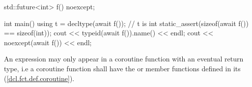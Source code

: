 \enterexample
\begin{codeblock}	
std::future<int> f() noexcept;
	
int main() {
  using t = decltype(await f()); // t is int
  static_assert(sizeof(await f()) == sizeof(int));
  cout << typeid(await f()).name() << endl;
  cout << noexcept(await f()) << endl;
}
\end{codeblock}
\exitexample%

\pnum
An  expression may only appear in a coroutine function 
with an eventual return type, i.e a coroutine function shall have the  or  member
functions defined in its  (\ref{dcl.fct.def.coroutine}).
